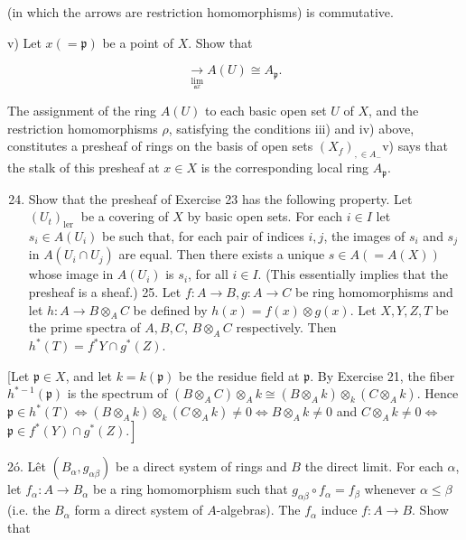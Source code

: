 \documentclass{standalone}
\theoremstyle{definition}
\theoremstyle{remark}
\begin{document}
\begin{center}
\end{center}

(in which the arrows are restriction homomorphisms) is commutative.

v) Let $x(=\mathfrak{p})$ be a point of $X$. Show that

\[
\underset{\lim _{\mathfrak{a} x}}{\longrightarrow} A(U) \cong A_{\mathfrak{p}} .
\]

The assignment of the ring $A(U)$ to each basic open set $U$ of $X$, and the restriction homomorphisms $\rho$, satisfying the conditions iii) and iv) above, constitutes a presheaf of rings on the basis of open sets $\left(X_{f}\right)_{, \in A_{-}}$v) says that the stalk of this presheaf at $x \in X$ is the corresponding local ring $A_{\mathfrak{p}}$.

\begin{enumerate}
  \setcounter{enumi}{23}
  \item Show that the presheaf of Exercise 23 has the following property. Let $\left(U_{t}\right)_{\text {ler }}$ be a covering of $X$ by basic open sets. For each $i \in I$ let $s_{i} \in A\left(U_{i}\right)$ be such that, for each pair of indices $i, j$, the images of $s_{i}$ and $s_{j}$ in $A\left(U_{i} \cap U_{j}\right)$ are equal. Then there exists a unique $s \in A(=A(X))$ whose image in $A\left(U_{i}\right)$ is $s_{i}$, for all $i \in I$. (This essentially implies that the presheaf is a sheaf.) 25. Let $f: A \rightarrow B, g: A \rightarrow C$ be ring homomorphisms and let $h: A \rightarrow B \otimes_{A} C$ be defined by $h(x)=f(x) \otimes g(x)$. Let $X, Y, Z, T$ be the prime spectra of $A, B, C$, $B \otimes_{A} C$ respectively. Then $h^{*}(T)=f^{*} Y \cap g^{*}(Z)$.
\end{enumerate}

[Let $\mathfrak{p} \in X$, and let $k=k(\mathfrak{p})$ be the residue field at $\mathfrak{p}$. By Exercise 21, the fiber $h^{*-1}(\mathfrak{p})$ is the spectrum of $\left(B \otimes_{A} C\right) \otimes_{A} k \cong\left(B \otimes_{A} k\right) \otimes_{k}\left(C \otimes_{A} k\right)$. Hence $\mathfrak{p} \in h^{*}(T) \Leftrightarrow\left(B \otimes_{A} k\right) \otimes_{k}\left(C \otimes_{A} k\right) \neq 0 \Leftrightarrow B \otimes_{A} k \neq 0$ and $C \otimes_{A} k \neq 0 \Leftrightarrow$ $\left.\mathfrak{p} \in f^{*}(Y) \cap g^{*}(Z).\right]$

2ó. Lêt $\left(B_{\alpha}, g_{\alpha \beta}\right)$ be a direct system of rings and $B$ the direct limit. For each $\alpha$, let $f_{\alpha}: A \rightarrow B_{\alpha}$ be a ring homomorphism such that $g_{\alpha \beta} \circ f_{\alpha}=f_{\beta}$ whenever $\alpha \leqslant \beta$ (i.e. the $B_{\alpha}$ form a direct system of $A$-algebras). The $f_{\alpha}$ induce $f: A \rightarrow B$. Show that
\end{document}
